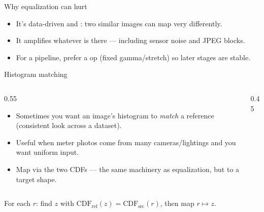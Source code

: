 \documentclass[10pt,aspectratio=169]{beamer}
\begin{document}
\begin{frame}{Why equalization can hurt}
  \begin{itemize}
    \item It's data-driven and : two similar images can map very differently.
    \item It amplifies whatever is there — including sensor noise and JPEG blocks.
    \item For a pipeline, prefer a  op (fixed gamma/stretch) so later stages are stable.
  \end{itemize}
\end{frame}

\begin{frame}{Histogram matching}
  \begin{columns}[T]
    \begin{column}{0.55\textwidth}
      \begin{itemize}
        \item Sometimes you want an image's histogram to \emph{match} a reference (consistent look across a dataset).
        \item Useful when meter photos come from many cameras/lightings and you want uniform input.
        \item Map via the two CDFs — the same machinery as equalization, but to a target shape.
      \end{itemize}
    \end{column}
    \begin{column}{0.45\textwidth}
    \begin{center}
    \end{center}
    \end{column}
  \end{columns}
  \begin{mathbox}
    For each $r$: find $z$ with $\mathrm{CDF}_{\text{ref}}(z)=\mathrm{CDF}_{\text{src}}(r)$, then map $r\mapsto z$.
  \end{mathbox}
\end{frame}
\end{document}
